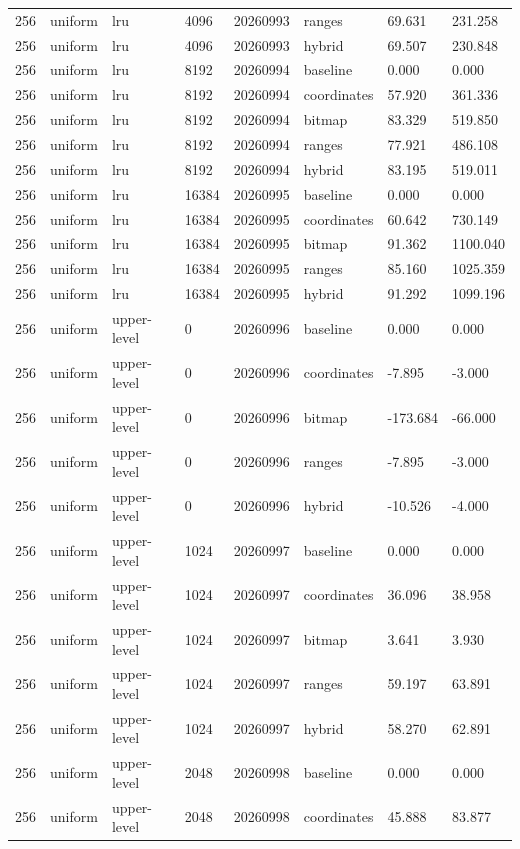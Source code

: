 \begin{tabular}{llllllll}
256 & uniform & lru & 4096 & 20260993 & ranges & 69.631 & 231.258 \\
256 & uniform & lru & 4096 & 20260993 & hybrid & 69.507 & 230.848 \\
256 & uniform & lru & 8192 & 20260994 & baseline & 0.000 & 0.000 \\
256 & uniform & lru & 8192 & 20260994 & coordinates & 57.920 & 361.336 \\
256 & uniform & lru & 8192 & 20260994 & bitmap & 83.329 & 519.850 \\
256 & uniform & lru & 8192 & 20260994 & ranges & 77.921 & 486.108 \\
256 & uniform & lru & 8192 & 20260994 & hybrid & 83.195 & 519.011 \\
256 & uniform & lru & 16384 & 20260995 & baseline & 0.000 & 0.000 \\
256 & uniform & lru & 16384 & 20260995 & coordinates & 60.642 & 730.149 \\
256 & uniform & lru & 16384 & 20260995 & bitmap & 91.362 & 1100.040 \\
256 & uniform & lru & 16384 & 20260995 & ranges & 85.160 & 1025.359 \\
256 & uniform & lru & 16384 & 20260995 & hybrid & 91.292 & 1099.196 \\
256 & uniform & upper-level & 0 & 20260996 & baseline & 0.000 & 0.000 \\
256 & uniform & upper-level & 0 & 20260996 & coordinates & -7.895 & -3.000 \\
256 & uniform & upper-level & 0 & 20260996 & bitmap & -173.684 & -66.000 \\
256 & uniform & upper-level & 0 & 20260996 & ranges & -7.895 & -3.000 \\
256 & uniform & upper-level & 0 & 20260996 & hybrid & -10.526 & -4.000 \\
256 & uniform & upper-level & 1024 & 20260997 & baseline & 0.000 & 0.000 \\
256 & uniform & upper-level & 1024 & 20260997 & coordinates & 36.096 & 38.958 \\
256 & uniform & upper-level & 1024 & 20260997 & bitmap & 3.641 & 3.930 \\
256 & uniform & upper-level & 1024 & 20260997 & ranges & 59.197 & 63.891 \\
256 & uniform & upper-level & 1024 & 20260997 & hybrid & 58.270 & 62.891 \\
256 & uniform & upper-level & 2048 & 20260998 & baseline & 0.000 & 0.000 \\
256 & uniform & upper-level & 2048 & 20260998 & coordinates & 45.888 & 83.877 \\

\end{tabular}
